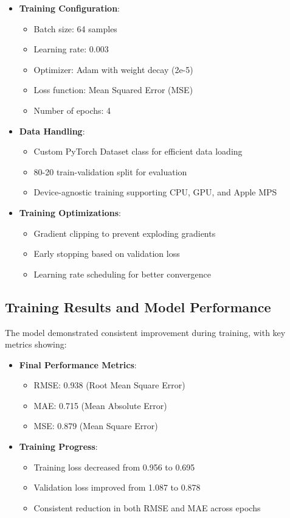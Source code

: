 \documentclass[12pt]{article}
\begin{document}
\begin{itemize}
    \item \textbf{Training Configuration}:
    \begin{itemize}
        \item Batch size: 64 samples
        \item Learning rate: 0.003
        \item Optimizer: Adam with weight decay (2e-5)
        \item Loss function: Mean Squared Error (MSE)
        \item Number of epochs: 4
    \end{itemize}
    
    \item \textbf{Data Handling}:
    \begin{itemize}
        \item Custom PyTorch Dataset class for efficient data loading
        \item 80-20 train-validation split for evaluation
        \item Device-agnostic training supporting CPU, GPU, and Apple MPS
    \end{itemize}
    
    \item \textbf{Training Optimizations}:
    \begin{itemize}
        \item Gradient clipping to prevent exploding gradients
        \item Early stopping based on validation loss
        \item Learning rate scheduling for better convergence
    \end{itemize}
\end{itemize}

\subsection{Training Results and Model Performance}
The model demonstrated consistent improvement during training, with key metrics showing:

\begin{itemize}
    \item \textbf{Final Performance Metrics}:
    \begin{itemize}
        \item RMSE: 0.938 (Root Mean Square Error)
        \item MAE: 0.715 (Mean Absolute Error)
        \item MSE: 0.879 (Mean Square Error)
    \end{itemize}
    
    \item \textbf{Training Progress}:
    \begin{itemize}
        \item Training loss decreased from 0.956 to 0.695
        \item Validation loss improved from 1.087 to 0.878
        \item Consistent reduction in both RMSE and MAE across epochs
    \end{itemize}
\end{itemize}
\end{document}
